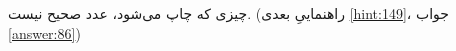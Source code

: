 \section{}
\paragraph{}\label{hint:123}
چیزی که چاپ می‌شود، عدد صحیح نیست. (راهنماییِ بعدی \ref{hint:149}، جواب \ref{answer:86})